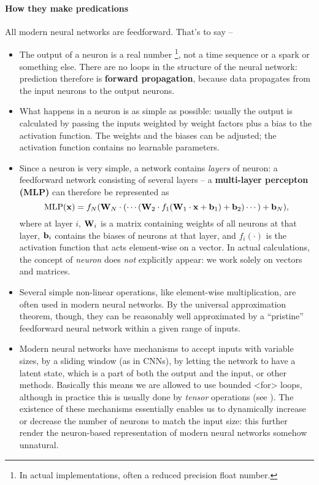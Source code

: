 \documentclass[hyperref, a4paper, 12pt]{report}
\newcommand*{\concept}[1]{{\textbf{#1}}}
\def\texttt#1{<#1>}%
\newcommand{\shortcode}[1]{\texttt{#1}}
\begin{document}
\paragraph*{How they make predications}
All modern neural networks are feedforward. That's to say -- 
\begin{itemize}
    \item The output of a neuron is a real number%
    \footnote{
        In actual implementations, often a reduced precision float number.
    }, not a time sequence or a spark or something else.
    There are no loops in the structure of the neural network:
    prediction therefore is \concept{forward propagation},
    because data propagates from the input neurons to the output neurons.
    
    \item What happens in a neuron is as simple as possible:
    usually the output is calculated by 
    passing the inputs weighted by weight factors plus a bias
    to the activation function.
    The weights and the biases can be adjusted;
    the activation function contains no learnable parameters.

    \item Since a neuron is very simple, a network contains \emph{layers} of neuron:
    a feedforward network consisting of several layers -- a \concept{multi-layer percepton (MLP)} can therefore be represented as 
    \begin{equation}
        \mathrm{MLP}(\vb{x}) = f_N(\vb{W}_N \cdot (\cdots (\vb{W}_2 \cdot f_1(\vb{W}_1 \cdot \vb{x} + \vb{b}_1) + \vb{b}_2) \cdots) + \vb{b}_N),
        \label{eq:mlp}
    \end{equation}
    where at layer $i$, $\vb{W}_i$ is a matrix containing weights of all neurons at that layer, $\vb{b}_i$ contains the biases of neurons at that layer, and $f_i (\cdot)$ is the activation function that acts element-wise on a vector.
    In actual calculations, the concept of \emph{neuron} does \emph{not} explicitly appear:
    we work solely on vectors and matrices.

    \item Several simple non-linear operations, like element-wise multiplication,
    are often used in modern neural networks.
    By the universal approximation theorem, though, they can be reasonably well approximated by a ``pristine'' feedforward neural network within a given range of inputs.
    
    \item Modern neural networks have mechanisms to accept inputs with variable sizes,
    by a sliding window (as in CNNs), by letting the network to have a latent state,
    which is a part of both the output and the input, or other methods.
    Basically this means we are allowed to use bounded \shortcode{for} loops,
    although in practice this is usually done by \emph{tensor} operations (see ).
    The existence of these mechanisms essentially enables us to dynamically increase or decrease the number of neurons to match the input size:
    this further render the neuron-based representation of modern neural networks somehow unnatural.
\end{itemize}
\end{document}
